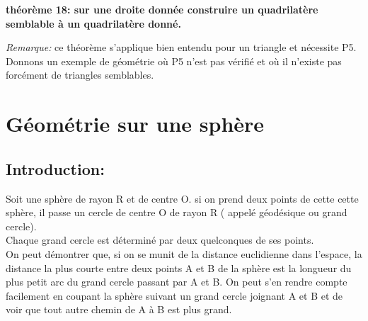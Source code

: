 \documentclass[a4paper, 12pt, twoside]{book}
\begin{document}
 \textbf{théorème 18: sur une droite donnée construire un quadrilatère semblable à un quadrilatère donné.}\
 
 \textit{Remarque:} ce théorème s'applique bien entendu pour un triangle et nécessite P5. \\
  
 
 
 
 
 
 


 
  
  
 
     



 
 

 


 
 
 
 

   
  
 \newpage  Donnons un exemple de géométrie où P5 n'est pas vérifié et où il n'existe pas forcément de triangles semblables.
  
  
  
  
  
  
  
 \chapter{Géométrie sur une sphère}
  
 \section{Introduction:}
\par
   Soit une sphère de rayon R et de centre O. si on prend deux points de cette cette sphère, il passe un cercle de centre O de rayon R (  appelé géodésique  ou grand cercle).\\
   
    Chaque grand cercle est déterminé  par deux quelconques de ses points.\\
    
     On peut démontrer que, si on se munit de la distance euclidienne dans l'espace, la distance la plus courte entre deux points A et B de la sphère est la longueur du plus petit arc du grand cercle passant par A et B.  On peut s'en rendre compte facilement en coupant la sphère suivant un grand cercle joignant A et B et de voir que tout autre chemin de A à B est plus grand.\\
     
\end{document}
